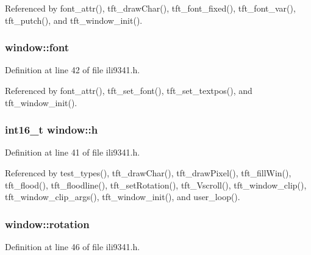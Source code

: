 Referenced by font\+\_\+attr(), tft\+\_\+draw\+Char(), tft\+\_\+font\+\_\+fixed(), tft\+\_\+font\+\_\+var(), tft\+\_\+putch(), and tft\+\_\+window\+\_\+init().

\subsubsection[{\texorpdfstring{font}{font}}]{ window\+::font}\hypertarget{structwindow_acee24e56db43557a46cbb5ca3fe35021}{}\label{structwindow_acee24e56db43557a46cbb5ca3fe35021}


Definition at line 42 of file ili9341.\+h.



Referenced by font\+\_\+attr(), tft\+\_\+set\+\_\+font(), tft\+\_\+set\+\_\+textpos(), and tft\+\_\+window\+\_\+init().

\subsubsection[{\texorpdfstring{h}{h}}]{\setlength{\rightskip}{0pt plus 5cm}int16\+\_\+t window\+::h}\hypertarget{structwindow_a822391abd5d09e6ce7152f68cff3ef2b}{}\label{structwindow_a822391abd5d09e6ce7152f68cff3ef2b}


Definition at line 41 of file ili9341.\+h.



Referenced by test\+\_\+types(), tft\+\_\+draw\+Char(), tft\+\_\+draw\+Pixel(), tft\+\_\+fill\+Win(), tft\+\_\+flood(), tft\+\_\+floodline(), tft\+\_\+set\+Rotation(), tft\+\_\+\+Vscroll(), tft\+\_\+window\+\_\+clip(), tft\+\_\+window\+\_\+clip\+\_\+args(), tft\+\_\+window\+\_\+init(), and user\+\_\+loop().

\subsubsection[{\texorpdfstring{rotation}{rotation}}]{ window\+::rotation}\hypertarget{structwindow_afbd48ebcb41e68d0f458dac593578aa8}{}\label{structwindow_afbd48ebcb41e68d0f458dac593578aa8}


Definition at line 46 of file ili9341.\+h.



